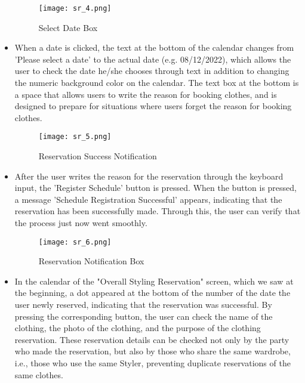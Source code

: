 \documentclass[conference]{IEEEtran}
\begin{document}
\begin{itemize}
    \newpage
    \begin{figure}[htbp]
    \centerline{\texttt{[image: sr\_4.png]}}
    \label{fig}
    \caption{Select Date Box}
    \end{figure}
    \item When a date is clicked, the text at the bottom of the calendar changes from 'Please select a date' to the actual date (e.g. 08/12/2022), which allows the user to check the date he/she chooses through text in addition to changing the numeric background color on the calendar.
    The text box at the bottom is a space that allows users to write the reason for booking clothes, and is designed to prepare for situations where users forget the reason for booking clothes.\\

    \begin{figure}[htbp]
    \centerline{\texttt{[image: sr\_5.png]}}
    \label{fig}
    \caption{Reservation Success Notification}
    \end{figure}
    \item After the user writes the reason for the reservation through the keyboard input, the 'Register Schedule' button is pressed. When the button is pressed, a message 'Schedule Registration Successful' appears, indicating that the reservation has been successfully made. Through this, the user can verify that the process just now went smoothly.\\
    
    \begin{figure}[htbp]
    \centerline{\texttt{[image: sr\_6.png]}}
    \label{fig}
    \caption{Reservation Notification Box}
    \end{figure}
    \item In the calendar of the "Overall Styling Reservation" screen, which we saw at the beginning, a dot appeared at the bottom of the number of the date the user newly reserved, indicating that the reservation was successful. By pressing the corresponding button, the user can check the name of the clothing, the photo of the clothing, and the purpose of the clothing reservation. These reservation details can be checked not only by the party who made the reservation, but also by those who share the same wardrobe, i.e., those who use the same Styler, preventing duplicate reservations of the same clothes.\\
    
\end{itemize}
\end{document}
